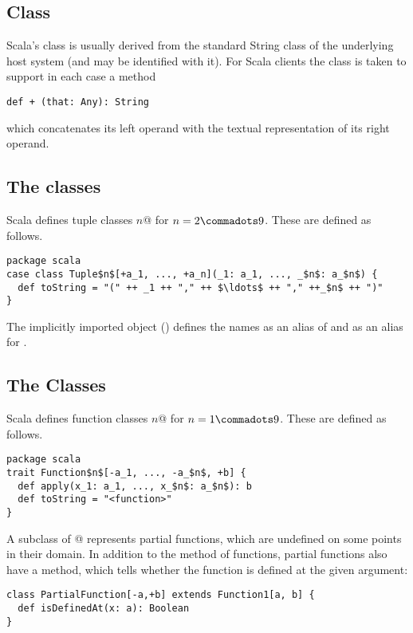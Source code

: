 {\subsection{Class \large{}}

Scala's \lstinline@String@ class is usually derived from the standard String
class of the underlying host system (and may be identified with
it). For Scala clients the class is taken to support in each case a
method
\begin{lstlisting}
def + (that: Any): String 
\end{lstlisting}
which concatenates its left operand with the textual representation of its
right operand.

\subsection{The \large{} classes}

Scala defines tuple classes \lstinline@Tuple$n$@ for $n = 2 \commadots 9$.
These are defined as follows.

\begin{lstlisting}
package scala 
case class Tuple$n$[+a_1, ..., +a_n](_1: a_1, ..., _$n$: a_$n$) {
  def toString = "(" ++ _1 ++ "," ++ $\ldots$ ++ "," ++_$n$ ++ ")"
}
\end{lstlisting}

The implicitly imported  object () defines
the names  as an alias of  and 
as an alias for .

\subsection{The \large{} Classes}
\label{sec:cls-function}

Scala defines function classes \lstinline@Function$n$@ for $n = 1 \commadots 9$.
These are defined as follows.

\begin{lstlisting}
package scala 
trait Function$n$[-a_1, ..., -a_$n$, +b] {
  def apply(x_1: a_1, ..., x_$n$: a_$n$): b 
  def toString = "<function>" 
}
\end{lstlisting}

A subclass of @ represents partial functions,
which are undefined on some points in their domain. In addition to the
 method of functions, partial functions also have a
 method, which tells whether the function is defined
at the given argument:
\begin{lstlisting}
class PartialFunction[-a,+b] extends Function1[a, b] {
  def isDefinedAt(x: a): Boolean
}
\end{lstlisting}

}
